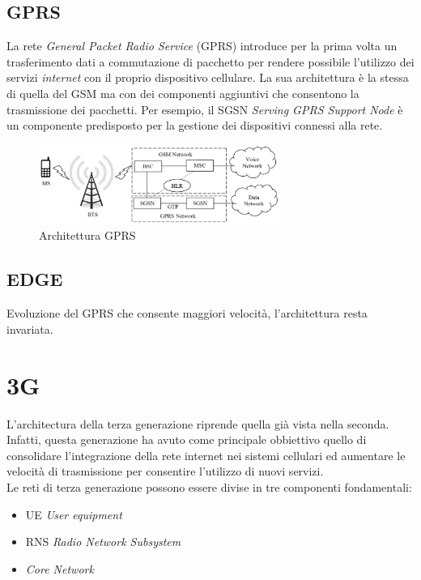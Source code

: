 \clearpage

\subsection{GPRS}
La rete \textit{General Packet Radio Service} (GPRS)\cite{gprs-edge} introduce per la prima volta un trasferimento dati a commutazione di pacchetto per rendere 
possibile l'utilizzo dei servizi \textit{internet} con il proprio dispositivo cellulare\cite{gsm-architecture}.
La sua architettura è la stessa di quella del GSM ma con dei componenti aggiuntivi che consentono la trasmissione dei pacchetti. 
Per esempio, il SGSN \textit{Serving GPRS Support Node} è un componente predisposto per la gestione dei dispositivi connessi alla rete.
\begin{figure}[ht]
    \centering
    \includegraphics[width=0.7\textwidth]{images/2g-gprs.png}
    \caption{Architettura GPRS}
\end{figure}
\subsection{EDGE}
Evoluzione del GPRS che consente maggiori velocità, l'architettura resta invariata\cite{gprs-edge}.

\clearpage

\section{3G}
L'architectura della terza generazione riprende quella già vista nella seconda. Infatti, questa generazione ha avuto come principale obbiettivo 
quello di consolidare l'integrazione della rete internet nei sistemi cellulari ed aumentare le velocità di trasmissione per consentire l'utilizzo 
di nuovi servizi.\\
Le reti di terza generazione possono essere divise in tre componenti fondamentali:
\begin{itemize}
    \item UE \textit{User equipment}
    \item RNS \textit{Radio Network Subsystem}
    \item \textit{Core Network}
\end{itemize}

